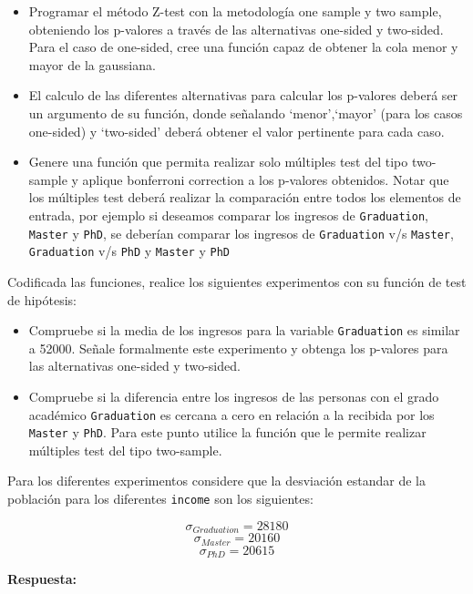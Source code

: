 \documentclass[]{article}
\begin{document}
\begin{itemize}
\item
  Programar el método Z-test con la metodología one sample y two sample,
  obteniendo los p-valores a través de las alternativas one-sided y
  two-sided. Para el caso de one-sided, cree una función capaz de
  obtener la cola menor y mayor de la gaussiana.
\item
  El calculo de las diferentes alternativas para calcular los p-valores
  deberá ser un argumento de su función, donde señalando `menor',`mayor'
  (para los casos one-sided) y `two-sided' deberá obtener el valor
  pertinente para cada caso.
\item
  Genere una función que permita realizar solo múltiples test del tipo
  two-sample y aplique bonferroni correction a los p-valores obtenidos.
  Notar que los múltiples test deberá realizar la comparación entre
  todos los elementos de entrada, por ejemplo si deseamos comparar los
  ingresos de \texttt{Graduation}, \texttt{Master} y \texttt{PhD}, se
  deberían comparar los ingresos de \texttt{Graduation} v/s
  \texttt{Master}, \texttt{Graduation} v/s \texttt{PhD} y
  \texttt{Master} y \texttt{PhD}
\end{itemize}

Codificada las funciones, realice los siguientes experimentos con su
función de test de hipótesis:

\begin{itemize}
\item
  Compruebe si la media de los ingresos para la variable
  \texttt{Graduation} es similar a 52000. Señale formalmente este
  experimento y obtenga los p-valores para las alternativas one-sided y
  two-sided.
\item
  Compruebe si la diferencia entre los ingresos de las personas con el
  grado académico \texttt{Graduation} es cercana a cero en relación a la
  recibida por los \texttt{Master} y \texttt{PhD}. Para este punto
  utilice la función que le permite realizar múltiples test del tipo
  two-sample.
\end{itemize}

Para los diferentes experimentos considere que la desviación estandar de
la población para los diferentes \texttt{income} son los siguientes:

\[\sigma_{Graduation} = 28180\] \[\sigma_{Master} = 20160\]
\[\sigma_{PhD} = 20615\]

\textbf{Respuesta:}
\end{document}
